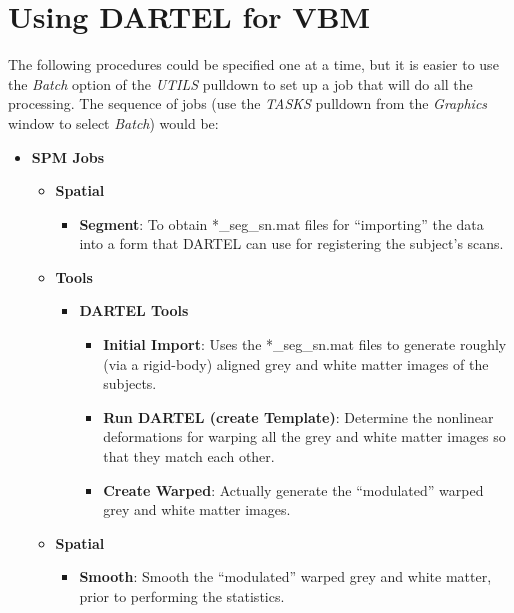 \section{Using DARTEL for VBM \label{Sec:dartel_vbm}}
The following procedures could be specified one at a time, but it is easier to use the \emph{Batch} option of the \emph{UTILS} pulldown to set up a job that will do all the processing.
The sequence of jobs (use the \emph{TASKS} pulldown from the \emph{Graphics} window to select \emph{Batch}) would be:
\begin{itemize}
\item{{\bf SPM Jobs}
  \begin{itemize}
  \item{{\bf Spatial}
    \begin{itemize}
    \item{{\bf Segment}: To obtain *\_seg\_sn.mat files for ``importing'' the data into a form that DARTEL can use for registering the subject's scans.
    }
    \end{itemize}
  }
  \item{{\bf Tools}
    \begin{itemize}
    \item{{\bf DARTEL Tools}
      \begin{itemize}
      \item{{\bf Initial Import}: Uses the *\_seg\_sn.mat files to generate roughly (via a rigid-body) aligned grey and white matter images of the subjects.
      }
      \item{{\bf Run DARTEL (create Template)}: Determine the nonlinear deformations for warping all the grey and white matter images so that they match each other.
      }
      \item{{\bf Create Warped}: Actually generate the ``modulated'' warped grey and white matter images. 
      }
      \end{itemize}
    }
    \end{itemize}
  }
  \item{{\bf Spatial}
    \begin{itemize}
    \item{{\bf Smooth}: Smooth the ``modulated'' warped grey and white matter, prior to performing the statistics.
    }
    \end{itemize}
  }
  \end{itemize}
}
\end{itemize}

